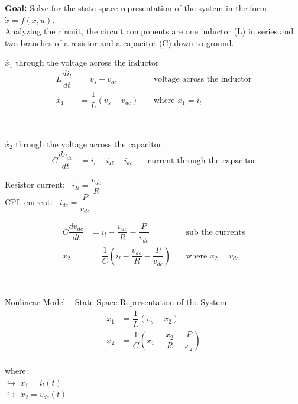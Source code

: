\documentclass[12pt]{article}
\begin{document}
\textbf{Goal:} Solve for the state space representation of the system in the form $\dot{x} = f(x, u)$.\\

Analyzing the circuit, the circuit components are one inductor (L) in series and two branches of a resistor and a capacitor (C) down to ground. \\

\begin{tcolorbox}[enhanced, frame hidden, colback=white, borderline west={1pt}{0pt}{gray}]
  \large{$\dot{x_1}$ through the voltage across the inductor}
  \normalsize{}
  \begin{align*}
    L\dfrac{di_l}{dt} &= v_s - v_{dc} & \ & \text{voltage across the inductor}\\
    \dot{x_1} &= \dfrac{1}{L}(v_s-v_{dc}) & \ & \text{where } x_1 = i_l
  \end{align*}
\end{tcolorbox}

\

\begin{tcolorbox}[enhanced, frame hidden, colback=white, borderline west={1pt}{0pt}{gray}]
  \large{$\dot{x_2}$ through the voltage across the capacitor}
  \normalsize{}
  \begin{align*}
    C\dfrac{dv_{dc}}{dt} &= i_l - i_R -i_{dc} & \ & \text{current through the capacitor}
  \end{align*}
  \begin{tcolorbox}[enhanced, frame hidden, colback=white, borderline west={1pt}{0pt}{gray}]
    Resistor current: \ $i_R = \dfrac{v_{dc}}{R}$\\
    CPL current: \ $i_{dc} = \dfrac{P}{v_{dc}}$
  \end{tcolorbox}
  \begin{align*}
    C\dfrac{dv_{dc}}{dt} &= i_l - \dfrac{v_{dc}}{R} -\dfrac{P}{v_{dc}} & \ & \text{sub the currents}\\
    \dot{x_2} &= \dfrac{1}{C}(i_l - \dfrac{v_{dc}}{R} -\dfrac{P}{v_{dc}}) & \ & \text{where } x_2 = v_{dc}
  \end{align*}
\end{tcolorbox}

\

\begin{tcolorbox}[enhanced, frame hidden, colback=white, borderline west={1pt}{0pt}{gray}]
  \large{Nonlinear Model -- State Space Representation of the System}
  \normalsize{}
  \[
  \boxed{
    \begin{aligned}
      \dot{x_1} &= \dfrac{1}{L}(v_s - x_2)\\
      \dot{x_2} &= \dfrac{1}{C}(x_1 - \dfrac{x_2}{R} - \dfrac{P}{x_2})\\
    \end{aligned}
  }
  \]

  where:\\
  $\hookrightarrow$ $x_1 = i_l(t)$\\
  $\hookrightarrow$ $x_2 = v_{dc}(t)$
\end{tcolorbox}
\end{document}
